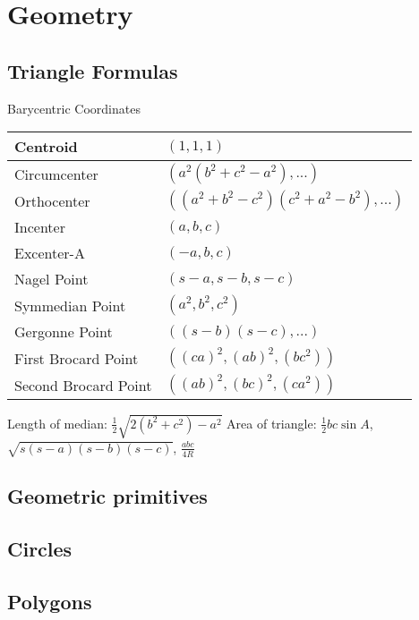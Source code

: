 \chapter{Geometry}

\section{Triangle Formulas}
  Barycentric Coordinates
  \begin{tabular}{|l|l|}
    \hline
    Centroid & $(1, 1, 1)$ \\
    \hline
    Circumcenter &     $( a^2(b^2+c^2-a^2), ... )$ \\
		\hline
    Orthocenter &      $( (a^2+b^2-c^2)(c^2+a^2-b^2), ... )$ \\
		\hline
    Incenter &         $( a, b, c )$ \\
		\hline
    Excenter-A &       $( -a, b, c )$ \\
		\hline
    Nagel Point &      $( s-a, s-b, s-c )$ \\
		\hline
    Symmedian Point &  $( a^2, b^2, c^2 )$ \\
		\hline
    Gergonne Point &   $( (s-b)(s-c), ... )$ \\
		\hline
    First Brocard Point &   $( (ca)^2, (ab)^2, (bc^2) )$ \\
		\hline
    Second Brocard Point &  $( (ab)^2, (bc)^2, (ca^2) )$ \\
		\hline
  \end{tabular}

  Length of median: $\frac12\sqrt{2(b^2+c^2)-a^2}$
  Area of triangle: $\frac12bc\sin A$, $\sqrt{s(s-a)(s-b)(s-c)}$, $\frac{abc}{4R}$

\section{Geometric primitives}

\section{Circles}

\section{Polygons}

